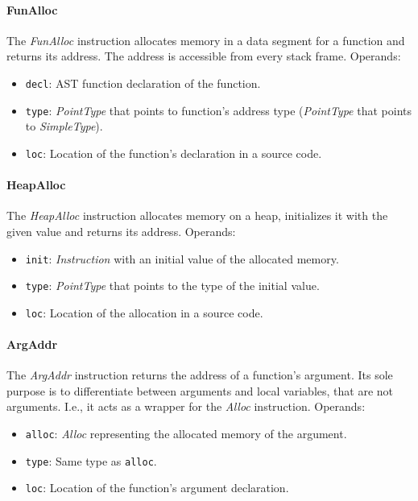 \documentclass[thesis=M,english]{FITthesis}[2019/12/23]
\begin{document}
\paragraph*{FunAlloc} The \emph{FunAlloc} instruction allocates memory in a data segment for a function and returns its address. The address is accessible from every stack frame. Operands:
\begin{itemize}
    \item \texttt{decl}: AST function declaration of the function.
    \item \texttt{type}: \emph{PointType} that points to function's address type (\emph{PointType} that points to \emph{SimpleType}).
    \item \texttt{loc}: Location of the function's declaration in a source code.
\end{itemize}

\paragraph*{HeapAlloc} The \emph{HeapAlloc} instruction allocates memory on a heap, initializes it with the given value and returns its address. Operands:
\begin{itemize}
    \item \texttt{init}: \emph{Instruction} with an initial value of the allocated memory.
    \item \texttt{type}: \emph{PointType} that points to the type of the initial value.
    \item \texttt{loc}: Location of the allocation in a source code.
\end{itemize}

\paragraph*{ArgAddr} The \emph{ArgAddr} instruction returns the address of a function's argument. Its sole purpose is to differentiate between arguments and local variables, that are not arguments. I.e., it acts as a wrapper for the \emph{Alloc} instruction. Operands:
\begin{itemize}
    \item \texttt{alloc}: \emph{Alloc} representing the allocated memory of the argument.
    \item \texttt{type}: Same type as \texttt{alloc}.
    \item \texttt{loc}: Location of the function's argument declaration.
\end{itemize}
\end{document}
